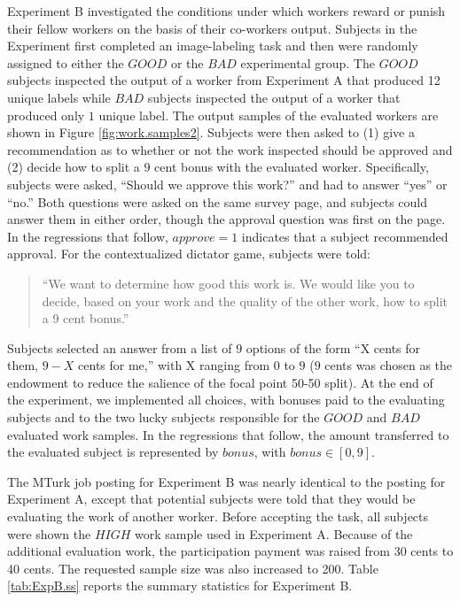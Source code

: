 \documentclass[12pt]{article}
\begin{document}
Experiment B investigated the conditions under which workers reward or
punish their fellow workers on the basis of their co-workers
output. Subjects in the Experiment first completed an image-labeling
task and then were randomly assigned to either the $GOOD$ or the $BAD$
experimental group. The $GOOD$ subjects inspected the output of a
worker from Experiment A that produced 12 unique labels while $BAD$
subjects inspected the output of a worker that produced only $1$
unique label. The output samples of the evaluated workers are shown in
Figure \ref{fig:work.samples2}. Subjects were then asked to (1) give a
recommendation as to whether or not the work inspected should be
approved and (2) decide how to split a $9$ cent bonus with the
evaluated worker.  Specifically, subjects were asked, ``Should we
approve this work?'' and had to answer ``yes'' or ``no.''  Both
questions were asked on the same survey page, and subjects could
answer them in either order, though the approval question was first on
the page. In the regressions that follow, $approve=1$ indicates that a
subject recommended approval. For the contextualized dictator game,
subjects were told:
\begin{quote}
 ``We want to determine how good this work is. We would like you to
  decide, based on your work and the quality of the other work, how to
  split a 9 cent bonus.''
  \end{quote} 
Subjects selected an answer from a list of $9$ options of the form ``X
cents for them, $9 - X$ cents for me,'' with X ranging from $0$ to $9$
($9$ cents was chosen as the endowment to reduce the salience of the
focal point 50-50 split). At the end of the experiment, we implemented
all choices, with bonuses paid to the evaluating subjects and to the
two lucky subjects responsible for the $GOOD$ and $BAD$ evaluated work
samples. In the regressions that follow, the amount transferred to the
evaluated subject is represented by $bonus$, with $bonus \in
[0,9]$.



The MTurk job posting for Experiment B was nearly identical to the
posting for Experiment A, except that potential subjects were told
that they would be evaluating the work of another worker.  Before
accepting the task, all subjects were shown the $HIGH$ work sample
used in Experiment A. Because of the additional evaluation work, the
participation payment was raised from 30 cents to 40 cents. The
requested sample size was also increased to 200. Table
\ref{tab:ExpB.ss} reports the summary statistics for Experiment B.
\end{document}
